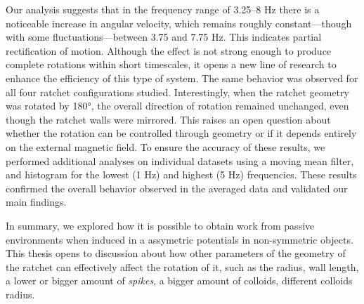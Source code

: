 Our analysis suggests that in the frequency range of 3.25–8 Hz there is a noticeable increase in angular velocity, which remains roughly constant—though with some fluctuations—between 3.75 and 7.75 Hz. This indicates partial rectification of motion. Although the effect is not strong enough to produce complete rotations within short timescales, it opens a new line of research to enhance the efficiency of this type of system. The same behavior was observed for all four ratchet configurations studied. Interestingly, when the ratchet geometry was rotated by 180°, the overall direction of rotation remained unchanged, even though the ratchet walls were mirrored. This raises an open question about whether the rotation can be controlled through geometry or if it depends entirely on the external magnetic field.
To ensure the accuracy of these results, we performed additional analyses on individual datasets using a moving mean filter, and histogram for the lowest (1 Hz) and highest (5 Hz) frequencies. These results confirmed the overall behavior observed in the averaged data and validated our main findings.

In summary, we explored how it is possible to obtain work from passive environments when induced in a assymetric potentials in non-symmetric objects. This thesis opens to discussion about how other parameters of the geometry of the ratchet can effectively affect the rotation of it, such as the radius, wall length, a lower or bigger amount of \textit{spikes}, a bigger amount of colloids, different colloids radius. 
